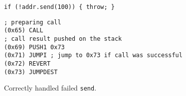 \begin{figure}
	\centering
	\begin{lstlisting}[language=Solidity,basicstyle=\footnotesize\ttfamily,label=fig:handled-exception-solidity,caption=Failure handling in Solidity.]
if (!addr.send(100)) { throw; }
\end{lstlisting}
	\begin{lstlisting}[language=esm, basicstyle=\footnotesize\ttfamily,caption=EVM instructions for failure handling.,label=fig:handled-exception-instructions]
; preparing call
(0x65) CALL
; call result pushed on the stack
(0x69) PUSH1 0x73
(0x71) JUMPI ; jump to 0x73 if call was successful
(0x72) REVERT
(0x73) JUMPDEST
\end{lstlisting}
	\caption{Correctly handled failed \lstinline{send}.}
	\label{fig:handled-exception}
\end{figure}




